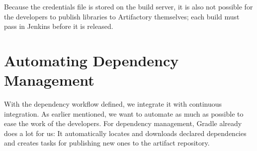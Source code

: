 Because the credentials file is stored on the build server, it is also not possible for the developers to publish libraries to Artifactory themselves; each build must pass in Jenkins before it is released.

\section{Automating Dependency Management}\label{sec:automating_vm}
With the dependency workflow defined, we integrate it with continuous integration. As earlier mentioned, we want to automate as much as possible to ease the work of the developers. For dependency management, Gradle already does a lot for us: It automatically locates and downloads declared dependencies and creates tasks for publishing new ones to the artifact repository.

